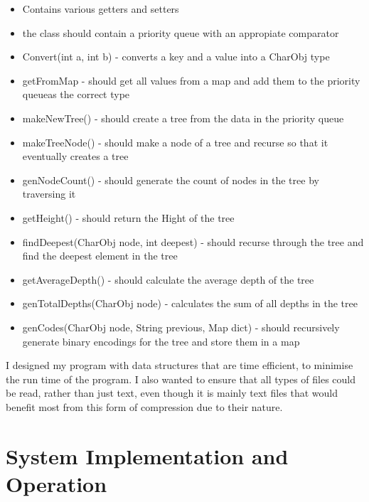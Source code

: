 \documentclass[11pt, oneside]{amsart}
\begin{document}
\begin{itemize}
		\begin{itemize}
			\item Contains various getters and setters
			\item the class should contain a priority queue with an appropiate comparator
			\item Convert(int a, int b) - converts a key and a value into a CharObj type
			\item getFromMap - should get all values from a map and add them to the priority queueas the correct type
			\item makeNewTree() - should create a tree from the data in the priority queue
			\item makeTreeNode() - should make a node of a tree and recurse so that it eventually creates a tree
			\item genNodeCount() - should generate the count of nodes in the tree by traversing it
			\item getHeight() - should return the Hight of the tree
			\item findDeepest(CharObj node, int deepest) - should recurse through the tree and find the deepest element in the tree
			\item getAverageDepth() - should calculate the average depth of the tree
			\item genTotalDepths(CharObj node) - calculates the sum of all depths in the tree
			\item genCodes(CharObj node, String previous, Map dict) - should recursively generate binary encodings for the tree and store them in a map
		\end{itemize}
	\end{itemize}
	I designed my program with data structures that are time efficient, to minimise the run time of the program. I also wanted to ensure that all types of files could be read, rather than just text, even though it is mainly text files that would benefit most from this form of compression due to their nature.
\section{System Implementation and Operation}
\end{document}
